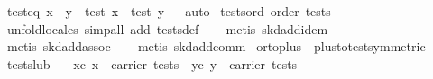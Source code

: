 \begin{isabellebody}
\endisatagproof
{\isafoldproof}%
%
\isadelimproof
\isanewline
%
\endisadelimproof
\isanewline
{}\isamarkupfalse%
\ test{}eq{}\ {}x\ {}\ y\ {}\ test\ x\ {}\ test\ y{}%
\isadelimproof
\ %
\endisadelimproof
%
\isatagproof
{}\isamarkupfalse%
\ auto%
\endisatagproof
{\isafoldproof}%
%
\isadelimproof
%
\endisadelimproof
\isanewline
\isanewline
\isanewline
\isanewline
{}\isamarkupfalse%
\ tests{}ord{}\ {}order\ tests{}\isanewline
%
\isadelimproof
\ \ %
\endisadelimproof
%
\isatagproof
{}\isamarkupfalse%
\ {}unfold{}locales{}\ simp{}all\ add{}\ tests{}def{}\isanewline
\ \ \isamarkupfalse%
\ {}metis\ skd{}add{}idem{}\isanewline
\ \ \isamarkupfalse%
\ {}metis\ skd{}add{}assoc{}\isanewline
\ \ \isamarkupfalse%
\ {}metis\ skd{}add{}comm{}%
\endisatagproof
{\isafoldproof}%
%
\isadelimproof
\isanewline
%
\endisadelimproof
\isanewline
{}\isamarkupfalse%
\ or{}to{}plus\ {}\ plus{}to{}test{}symmetric{}\isanewline
\isanewline
{}\isamarkupfalse%
\ tests{}lub{}\isanewline
\ \ \ xc{}\ {}x\ {}\ carrier\ tests{}\ \ yc{}\ {}y\ {}\ carrier\ tests{}\isanewline

\end{isabellebody}
